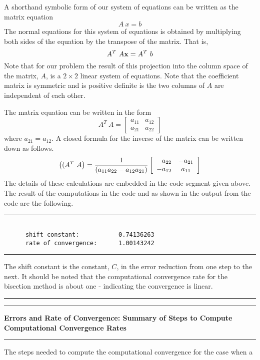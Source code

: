 \documentclass[10pt,fleqn]{article}
\begin{document}
A shorthand symbolic form of our system of equations can be written as the
matrix equation
$$
  A\ x = b
$$ 
The normal equations for this system of equations is obtained by multiplying
both sides of the equation by the transpose of the matrix. That is,
$$
  A^T\ A {\bf x} = A^T\ b
$$
Note that for our problem the result of this projection into the column space
of the matrix, $A$, is a $2\times 2$ linear system of equations. Note that the
coefficient matrix is symmetric and is positive definite is the two columns of
$A$ are independent of each other.

The matrix equation can be written in the form
$$
  A^T\ A = \left[
             \begin{array}{rcl}
               a_{11} & a_{12} \\ 
               a_{21} & a_{22} 
             \end{array}
          \right]
$$
where $a_{21}=a_{12}$. A closed formula for the inverse of the matrix can be
written down as follows.
$$
  \left((A^T\ A\right) = {1\over{(a_{11} a_{22} - a_{12} a_{21})}}
                         \left[
                           \begin{array}{rcl}
                             a_{22} & -a_{21} \\ 
                             -a_{12} & a_{11} 
                           \end{array}
                        \right]
$$
The details of these calculations are embedded in the code segment given above.
The result of the computations in the code and as shown in the output from the
code are the following.
\vskip0.1in\hrule\vskip0.1in
\begin{verbatim}

      shift constant:           0.74136263
      rate of convergence:      1.00143242

\end{verbatim}
\vskip0.1in\hrule\vskip0.1in
The shift constant is the constant, $C$, in the error reduction from one step to
the next. It should be noted that the computational convergence rate for the
bisection method is about one - indicating the convergence is linear.
\vskip0.1in\hrule\vskip0.1in
\newpage
\vskip0.1in\hrule\vskip0.1in
\noindent
{\bf Errors and Rate of Convergence: Summary of Steps to Compute Computational
Convergence Rates}
\vskip0.1in\hrule\vskip0.1in
The steps needed to compute the computational convergence for the case when a
\end{document}
